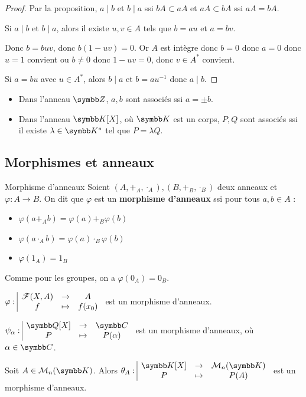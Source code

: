\begin{proof}
    Par la proposition, $a \mid b$ et $b \mid a$ ssi $bA \subset aA$ et $aA \subset bA$ ssi 
    $aA = bA$.

    Si $a \mid b$ et $b \mid a$, alors il existe $u, v \in A$ tels que
    $b = au$ et $a = bv$. 

    Donc $b = buv$, donc $b(1 - uv) = 0$. Or $A$ est intègre donc 
    $b = 0$ donc $a = 0$ donc $u = 1$ convient ou $b \neq 0$ donc $1 - uv = 0$, donc $v \in A^*$ convient. 

    Si $a = bu$ avec $u \in A^*$, alors $b \mid a $ et $b = au^{-1}$ donc $a \mid b$.
\end{proof}

\begin{exemple}
    \begin{itemize}
        \item Dans l'anneau $\Z$, $a, b$ sont associés ssi $a = \pm b$.

        \item Dans l'anneau $\K[X]$, où $\K$ est un corps, $P, Q$ sont associés ssi
        il existe $\lambda \in \K^*$ tel que $P = \lambda Q$.
    \end{itemize}
\end{exemple}

\subsection{Morphismes et anneaux}

\begin{definition}{Morphisme d'anneaux}{}
    Soient $(A, +_A, \cdot_A), (B, +_B, \cdot_B)$ deux anneaux et $\varphi : A \to B$. On dit que $\varphi$ est un
    \textbf{morphisme d'anneaux} ssi pour tous $a, b \in A$ :
    \begin{itemize}
        \item $\varphi(a +_A b) = \varphi(a) +_B \varphi(b)$
        \item $\varphi(a \cdot_A b) = \varphi(a) \cdot_B \varphi(b)$
        \item $\varphi(1_A) = 1_B$
    \end{itemize}
\end{definition}

\begin{remarque}
    Comme pour les groupes, on a $\varphi(0_A) = 0_B$.
\end{remarque}

\begin{exemple}
    $\varphi: \space \begin{array}{|ccc} \displaystyle \mathscr F(X, A) & \to & \displaystyle A \\ \displaystyle f & \mapsto & \displaystyle f(x_0) \end{array}$ est un morphisme d'anneaux. 

    \avspace 
    $\fonction{\psi_{\alpha}}{\Q [X]} \C P {P(\alpha)}$ est un morphisme d'anneaux, où $\alpha \in \C$.

    Soit $A \in \mathcal M_n(\K)$. Alors $\fonction {\theta_A}{\K[X]}{\mathcal M_n(\K)} P {P(A)}$ est un morphisme d'anneaux.
\end{exemple}

